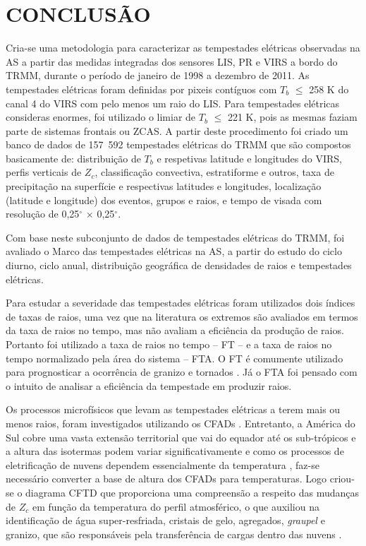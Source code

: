 \chapter{CONCLUSÃO}

Cria-se uma metodologia para caracterizar as tempestades elétricas observadas na AS a partir das medidas integradas dos sensores LIS, PR e VIRS a bordo do TRMM, durante o período de janeiro de 1998 a dezembro de 2011. As tempestades elétricas foram definidas por pixeis contíguos com $T_b$ $\leq$ 258 K do canal 4 do VIRS com pelo menos um raio do LIS. Para tempestades elétricas consideras enormes, foi utilizado o limiar de $T_b$ $\leq$ 221 K, pois as mesmas faziam parte de sistemas frontais ou ZCAS. A partir deste procedimento foi criado um banco de dados de 157~592 tempestades elétricas do TRMM que são compostos basicamente de: distribuição de $T_b$ e respetivas latitude e longitudes do VIRS, perfis verticais de $Z_c$, classificação convectiva, estratiforme e outros, taxa de precipitação na superfície e respectivas latitudes e longitudes, localização (latitude e longitude) dos eventos, grupos e raios,  e tempo de visada com resolução de 0,25$^{\circ}$ $\times$ 0,25$^{\circ}$.

Com base neste subconjunto de dados de tempestades elétricas do TRMM, foi avaliado o Marco das tempestades elétricas na AS, a partir do estudo do ciclo diurno, ciclo anual, distribuição geográfica de densidades de raios e tempestades elétricas.


Para estudar a severidade das tempestades elétricas foram utilizados dois índices de taxas de raios, uma vez que na literatura os extremos são avaliados em termos da taxa de raios no tempo, mas não avaliam a eficiência da produção de raios. Portanto foi utilizado a taxa de raios no tempo -- FT -- e a taxa de raios no tempo normalizado pela área do sistema -- FTA. O FT é comumente utilizado  para prognosticar a ocorrência de granizo e tornados \cite{williams1999,goodman1988,schultz2011,gatlin2010}. Já o FTA foi pensado com o intuito de analisar a eficiência da tempestade em produzir raios. 

Os processos microfísicos que levam as tempestades elétricas a terem mais ou menos raios, foram investigados utilizando os CFADs \cite{yuter1995}. Entretanto, a América do Sul cobre uma vasta extensão territorial que vai do equador até os sub-trópicos e a altura das isotermas podem variar significativamente e como os processos de eletrificação de nuvens  dependem essencialmente da temperatura \cite{Takahashi1978}, faz-se necessário converter a base de altura dos CFADs para temperaturas. Logo criou-se o diagrama CFTD que proporciona uma compreensão a respeito das mudanças de $Z_c$ em função da temperatura do perfil atmosférico, o que auxiliou na identificação de água super-resfriada, cristais de gelo, agregados, \textit{graupel} e granizo, que são responsáveis pela transferência de cargas dentro das nuvens \cite{Takahashi1978,saunders2008}.


